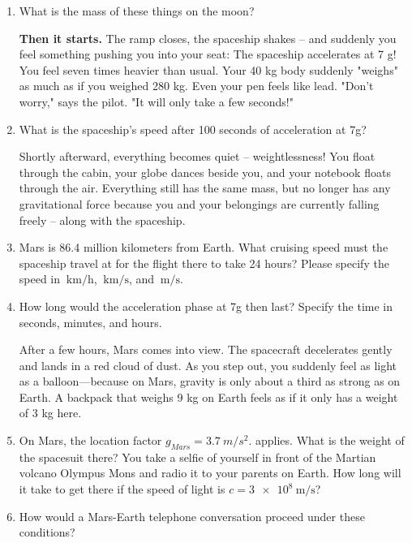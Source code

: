 \documentclass[a4paper]{article}
\begin{document}
\begin{enumerate}[1.]
		
		
		
		\item What is the mass of these things on the moon?
		
		{\bf Then it starts.} The ramp closes, the spaceship shakes – and suddenly you feel something pushing you into your seat:
		The spaceship accelerates at 7 g!
		You feel seven times heavier than usual.
		Your 40 kg body suddenly "weighs" as much as if you weighed 280 kg. Even your pen feels like lead.
		"Don't worry," says the pilot. "It will only take a few seconds!"
		
		\item What is the spaceship's speed after 100 seconds of acceleration at 7g?
		
		Shortly afterward, everything becomes quiet – weightlessness!
		You float through the cabin, your globe dances beside you, and your notebook floats through the air.
		Everything still has the same mass, but no longer has any gravitational force because you and your belongings are currently falling freely – along with the spaceship.
		
		\item Mars is 86.4 million kilometers from Earth. What cruising speed must the spaceship travel at for the flight there to take 24 hours?
		Please specify the speed in $\SI{}{\kilo\meter\per\hour}$, $\SI{}{\kilo\meter\per\second}$, and $\SI{}{\meter\per\second}$.
		\item How long would the acceleration phase at 7g then last? Specify the time in seconds, minutes, and hours.
		
		After a few hours, Mars comes into view. The spacecraft decelerates gently and lands in a red cloud of dust.
		As you step out, you suddenly feel as light as a balloon—because on Mars, gravity is only about a third as strong as on Earth.
		A backpack that weighs 9 kg on Earth feels as if it only has a weight of 3 kg here.
		
		\item On Mars, the location factor $g_{Mars}=\SI{3.7}{m\per s^2} .$ applies. What is the weight of the spacesuit there?
		You take a selfie of yourself in front of the Martian volcano Olympus Mons and radio it to your parents on Earth. How long will it take to get there if the speed of light is $c=\SI{3e8}{\meter\per\second}$?
		\item How would a Mars-Earth telephone conversation proceed under these conditions?
		

\end{enumerate}
\end{document}
